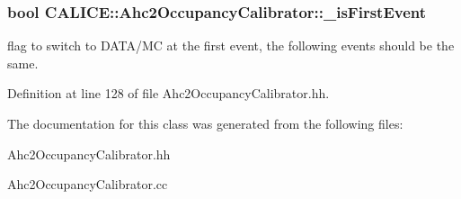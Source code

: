 \subsubsection[{\-\_\-is\-First\-Event}]{\setlength{\rightskip}{0pt plus 5cm}bool C\-A\-L\-I\-C\-E\-::\-Ahc2\-Occupancy\-Calibrator\-::\-\_\-is\-First\-Event\hspace{0.3cm}{\ttfamily [protected]}}\label{classCALICE_1_1Ahc2OccupancyCalibrator_a7f980b83820cdf653a0f9028c230f2d1}


flag to switch to D\-A\-T\-A/\-M\-C at the first event, the following events should be the same. 



Definition at line 128 of file Ahc2\-Occupancy\-Calibrator.\-hh.



The documentation for this class was generated from the following files\-:\begin{DoxyCompactItemize}
\item 
Ahc2\-Occupancy\-Calibrator.\-hh\item 
Ahc2\-Occupancy\-Calibrator.\-cc\end{DoxyCompactItemize}
